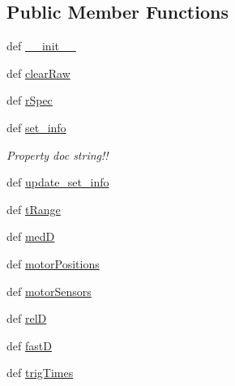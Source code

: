\subsection*{Public Member Functions}
\begin{DoxyCompactItemize}
\item 
def \hyperlink{classrepo_1_1programs_1_1pythonpackages_1_1pr_1_1SPDataSet_1_1SPDataSet_abc9d3a3ec4d2c9631244078690bfbee6}{\-\_\-\-\_\-init\-\_\-\-\_\-}
\item 
def \hyperlink{classrepo_1_1programs_1_1pythonpackages_1_1pr_1_1SPDataSet_1_1SPDataSet_a33ced34e094ccfd1e3891b92478613e7}{clear\-Raw}
\item 
def \hyperlink{classrepo_1_1programs_1_1pythonpackages_1_1pr_1_1SPDataSet_1_1SPDataSet_af6af62c7de4f7bc8f2dd223d05cf2b07}{r\-Spec}
\item 
def \hyperlink{classrepo_1_1programs_1_1pythonpackages_1_1pr_1_1SPDataSet_1_1SPDataSet_af17c964467367b46a56c14a8c87e84a2}{set\-\_\-info}
\begin{DoxyCompactList}\small\item\em Property doc string!! \end{DoxyCompactList}\item 
def \hyperlink{classrepo_1_1programs_1_1pythonpackages_1_1pr_1_1SPDataSet_1_1SPDataSet_a840bb6c513576d34e4f44299a4ca2046}{update\-\_\-set\-\_\-info}
\item 
def \hyperlink{classrepo_1_1programs_1_1pythonpackages_1_1pr_1_1SPDataSet_1_1SPDataSet_a0e6950849790e5787695a807f45b0d51}{t\-Range}
\item 
def \hyperlink{classrepo_1_1programs_1_1pythonpackages_1_1pr_1_1SPDataSet_1_1SPDataSet_a9eef53392c7e7ad757cefde737a6cb69}{med\-D}
\item 
def \hyperlink{classrepo_1_1programs_1_1pythonpackages_1_1pr_1_1SPDataSet_1_1SPDataSet_a8f689441aa1ded0237cabae51f95954f}{motor\-Positions}
\item 
def \hyperlink{classrepo_1_1programs_1_1pythonpackages_1_1pr_1_1SPDataSet_1_1SPDataSet_a1f51629896a09eb4e5d3c09c44b4823b}{motor\-Sensors}
\item 
def \hyperlink{classrepo_1_1programs_1_1pythonpackages_1_1pr_1_1SPDataSet_1_1SPDataSet_a6478ef339e0e44839e478fec7340c6b0}{rel\-D}
\item 
def \hyperlink{classrepo_1_1programs_1_1pythonpackages_1_1pr_1_1SPDataSet_1_1SPDataSet_aa400ad81219e782fe2e29e852b20bb28}{fast\-D}
\item 
def \hyperlink{classrepo_1_1programs_1_1pythonpackages_1_1pr_1_1SPDataSet_1_1SPDataSet_a14656e508d81193e8c71c09d9444e15f}{trig\-Times}

\end{DoxyCompactItemize}
